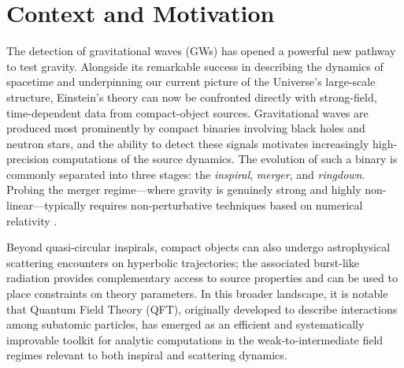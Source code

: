 \section{Context and Motivation}
The detection of gravitational waves (GWs) \cite{LIGOScientific:2016aoc, LIGOScientific:2016sjg, LIGOScientific:2016vlm, LIGOScientific:2017bnn, Kokeyama:2020dkg, LIGOScientific:2019hgc} has opened a powerful new pathway to test gravity. Alongside its remarkable success in describing the dynamics of spacetime and underpinning our current picture of the Universe’s large-scale structure, Einstein’s theory can now be confronted directly with strong-field, time-dependent data from compact-object sources. Gravitational waves are produced most prominently by compact binaries involving black holes and neutron stars, and the ability to detect these signals motivates increasingly high-precision computations of the source dynamics. The evolution of such a binary is commonly separated into three stages: the \textit{inspiral}, \textit{merger}, and \textit{ringdown}. Probing the merger regime---where gravity is genuinely strong and highly non-linear---typically requires non-perturbative techniques based on numerical relativity \cite{Gourgoulhon:2012,Lehner:2014asa, LIGOScientific:2014oec}.
\par
Beyond quasi-circular inspirals, compact objects can also undergo astrophysical scattering encounters on hyperbolic trajectories; the associated burst-like radiation provides complementary access to source properties and can be used to place constraints on theory parameters. In this broader landscape, it is notable that Quantum Field Theory (QFT), originally developed to describe interactions among subatomic particles, has emerged as an efficient and systematically improvable toolkit for analytic computations in the weak-to-intermediate field regimes relevant to both inspiral and scattering dynamics.
\noindent
